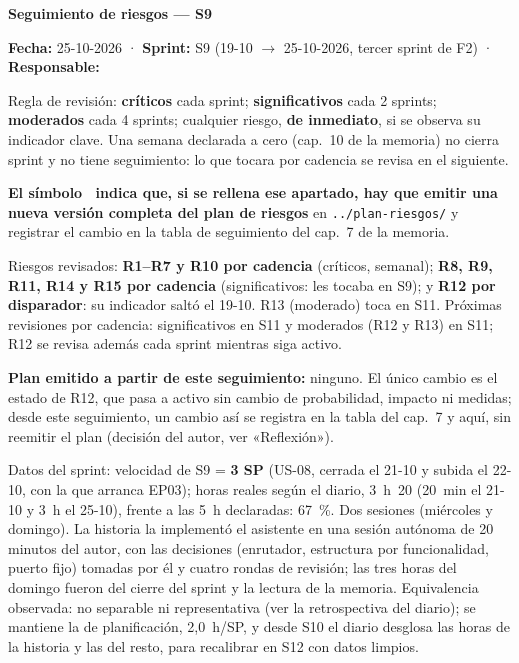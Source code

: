 \documentclass[11pt,a4paper]{article}
\begin{document}
\begin{center}
  {\LARGE\bfseries Seguimiento de riesgos — S9}\\[6pt]
\end{center}

\textbf{Fecha:} 25-10-2026 · \textbf{Sprint:} S9 (19-10 \(\to\) 25-10-2026, tercer sprint de F2) · \textbf{Responsable:} \thesisAuthor

Regla de revisión: \textbf{críticos} cada sprint; \textbf{significativos} cada 2 sprints; \textbf{moderados} cada 4 sprints; cualquier riesgo, \textbf{de inmediato}, si se observa su indicador clave.
Una semana declarada a cero (cap.~10 de la memoria) no cierra sprint y no tiene seguimiento: lo que tocara por cadencia se revisa en el siguiente.

\textbf{El símbolo \updatesymbol\ indica que, si se rellena ese apartado, hay que emitir una nueva versión completa del plan de riesgos} en \texttt{../plan-riesgos/} y registrar el cambio en la tabla de seguimiento del cap.~7 de la memoria.

Riesgos revisados:
\textbf{R1--R7 y R10 por cadencia} (críticos, semanal);
\textbf{R8, R9, R11, R14 y R15 por cadencia} (significativos: les tocaba en S9);
y \textbf{R12 por disparador}: su indicador saltó el 19-10.
R13 (moderado) toca en S11.
Próximas revisiones por cadencia: significativos en S11 y moderados (R12 y R13) en S11; R12 se revisa además cada sprint mientras siga activo.

\textbf{Plan emitido a partir de este seguimiento:} ninguno.
El único cambio es el estado de R12, que pasa a activo sin cambio de probabilidad, impacto ni medidas; desde este seguimiento, un cambio así se registra en la tabla del cap.~7 y aquí, sin reemitir el plan (decisión del autor, ver «Reflexión»).

Datos del sprint: velocidad de S9 = \textbf{3 SP} (US-08, cerrada el 21-10 y subida el 22-10, con la que arranca EP03); horas reales según el diario, 3~h~20 (20~min el 21-10 y 3~h el 25-10), frente a las 5~h declaradas: 67~\%.
Dos sesiones (miércoles y domingo).
La historia la implementó el asistente en una sesión autónoma de 20 minutos del autor, con las decisiones (enrutador, estructura por funcionalidad, puerto fijo) tomadas por él y cuatro rondas de revisión; las tres horas del domingo fueron del cierre del sprint y la lectura de la memoria.
Equivalencia observada: no separable ni representativa (ver la retrospectiva del diario); se mantiene la de planificación, 2,0~h/SP, y desde S10 el diario desglosa las horas de la historia y las del resto, para recalibrar en S12 con datos limpios.
\end{document}
